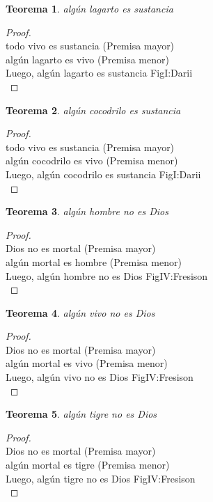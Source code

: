 ﻿\documentclass[12pt]{book}
\newtheorem{theorem}{Teorema}[chapter]
\newtheorem{proof}{Demostración}
\begin{document}
\begin{theorem}
algún lagarto es sustancia
\label{th: 102}
\end{theorem}\begin{proof}\\todo vivo es sustancia	 (Premisa mayor) \\algún lagarto es vivo	 (Premisa menor) \\Luego, algún lagarto es sustancia	FigI:Darii \\ \end{proof}
\begin{theorem}
algún cocodrilo es sustancia
\label{th: 103}
\end{theorem}\begin{proof}\\todo vivo es sustancia	 (Premisa mayor) \\algún cocodrilo es vivo	 (Premisa menor) \\Luego, algún cocodrilo es sustancia	FigI:Darii \\ \end{proof}
\begin{theorem}
algún hombre no es Dios
\label{th: 104}
\end{theorem}\begin{proof}\\Dios no es mortal	 (Premisa mayor) \\algún mortal es hombre	 (Premisa menor) \\Luego, algún hombre no es Dios	FigIV:Fresison \\ \end{proof}
\begin{theorem}
algún vivo no es Dios
\label{th: 105}
\end{theorem}\begin{proof}\\Dios no es mortal	 (Premisa mayor) \\algún mortal es vivo	 (Premisa menor) \\Luego, algún vivo no es Dios	FigIV:Fresison \\ \end{proof}
\begin{theorem}
algún tigre no es Dios
\label{th: 106}
\end{theorem}\begin{proof}\\Dios no es mortal	 (Premisa mayor) \\algún mortal es tigre	 (Premisa menor) \\Luego, algún tigre no es Dios	FigIV:Fresison \\ \end{proof}
\end{document}
